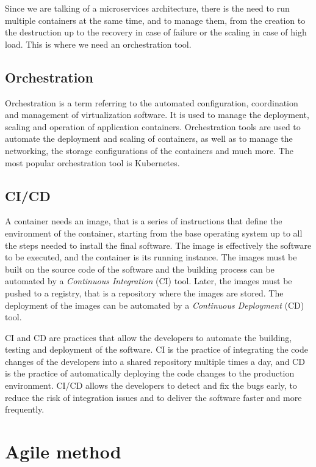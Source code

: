 Since we are talking of a microservices architecture, there is the need to run multiple containers at the same time, and to manage them, from the creation to the destruction up to the recovery in case of failure or the scaling in case of high load. This is where we need an orchestration tool.

\subsection{Orchestration}

Orchestration is a term referring to the automated configuration, coordination and management of virtualization software. It is used to manage the deployment, scaling and operation of application containers. Orchestration tools are used to automate the deployment and scaling of containers, as well as to manage the networking, the storage configurations of the containers and much more. The most popular orchestration tool is Kubernetes.

\subsection{CI/CD}

A container needs an image, that is a series of instructions that define the environment of the container, starting from the base operating system up to all the steps needed to install the final software. The image is effectively the software to be executed, and the container is its running instance. The images must be built on the source code of the software and the building process can be automated by a \textit{Continuous Integration} (CI) tool. Later, the images must be pushed to a registry, that is a repository where the images are stored. The deployment of the images can be automated by a \textit{Continuous Deployment} (CD) tool.

CI and CD are practices that allow the developers to automate the building, testing and deployment of the software. CI is the practice of integrating the code changes of the developers into a shared repository multiple times a day, and CD is the practice of automatically deploying the code changes to the production environment. CI/CD allows the developers to detect and fix the bugs early, to reduce the risk of integration issues and to deliver the software faster and more frequently.


\section{Agile method}

